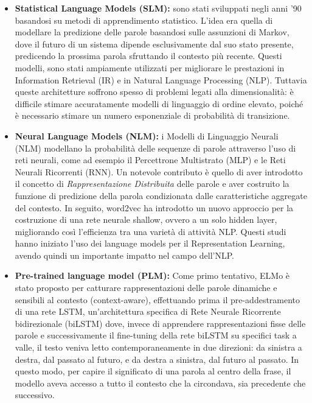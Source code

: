 \begin{itemize}
    \item \textbf{Statistical Language Models (SLM):} sono stati sviluppati negli anni '90 basandosi su metodi di apprendimento statistico. L'idea era quella di modellare la predizione delle parole basandosi sulle assunzioni di Markov, dove il futuro di un sistema dipende esclusivamente dal suo stato presente, predicendo la prossima parola sfruttando il contesto più recente. Questi modelli, sono stati ampiamente utilizzati per migliorare le prestazioni in Information Retrieval (IR) e in Natural Language Processing (NLP).
    Tuttavia queste architetture soffrono spesso di problemi legati alla dimensionalità: è difficile stimare accuratamente modelli di linguaggio di ordine elevato, poiché è necessario stimare un numero esponenziale di probabilità di transizione.
    \item \textbf{Neural Language Models (NLM):} i Modelli di Linguaggio Neurali (NLM) modellano la probabilità delle sequenze di parole attraverso l'uso di reti neurali, come ad esempio il Percettrone Multistrato (MLP) e le Reti Neurali Ricorrenti (RNN). Un notevole contributo è quello di aver introdotto il concetto di \textit{Rappresentazione Distribuita} delle parole e aver costruito la funzione di predizione della parola condizionata dalle caratteristiche aggregate del contesto.
    In seguito, word2vec ha introdotto un nuovo approccio per la costruzione di una rete neurale shallow, ovvero a un solo hidden layer, migliorando così l'efficienza tra una varietà di attività NLP. Questi studi hanno iniziato l'uso dei language models per il Representation Learning, avendo quindi un importante impatto nel campo dell'NLP.
    \item \textbf{Pre-trained language model (PLM):} Come primo tentativo, ELMo è stato proposto per catturare rappresentazioni delle parole dinamiche e sensibili al contesto (context-aware), effettuando prima il pre-addestramento di una rete LSTM, un'architettura specifica di Rete Neurale Ricorrente bidirezionale (biLSTM) dove, invece di apprendere rappresentazioni fisse delle parole e successivamente il fine-tuning della rete biLSTM su specifici task a valle, il testo veniva letto contemporaneamente in due direzioni: da sinistra a destra, dal passato al futuro, e da destra a sinistra, dal futuro al passato. In questo modo, per capire il significato di una parola al centro della frase, il modello aveva accesso a tutto il contesto che la circondava, sia precedente che successivo.\\

\end{itemize}

